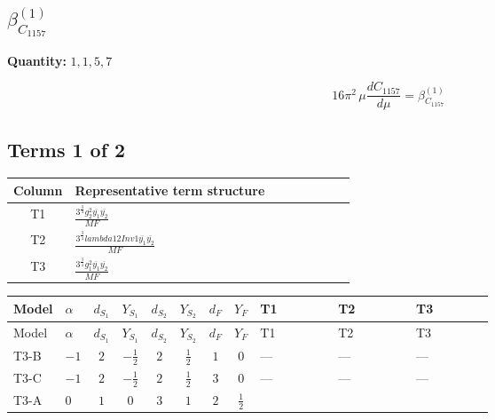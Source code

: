 \documentclass[8pt]{article}
\begin{document}
\begin{landscape}
\section*{$\beta_{C_{1157}}^{(1)}$}
\noindent\textbf{Quantity: }$\mathrm{1,1,5,7}$\par\smallskip
\[16\pi^2\,\mu\frac{d C_{1157}}{d\mu}=\beta_{C_{1157}}^{(1)}\]
\subsection*{Terms 1 of 2}
\begin{center}
\begin{tabular}{@{}c >{\raggedright\arraybackslash}p{0.82\linewidth}@{}}
\toprule
Column & Representative term structure \\
\midrule
T1 & \(\displaystyle \frac{3^{\frac{3}{4}} g_{2}^{2} \overline{y_{1}} \overline{y_{2}}}{MF}\) \\
\midrule
T2 & \(\displaystyle \frac{3^{\frac{3}{4}} lambda12Inv1 \overline{y_{1}} \overline{y_{2}}}{MF}\) \\
\midrule
T3 & \(\displaystyle \frac{3^{\frac{3}{4}} g_{1}^{2} \overline{y_{1}} \overline{y_{2}}}{MF}\) \\
\midrule
\bottomrule
\end{tabular}
\end{center}
\smallskip
\tiny
\begin{longtable}{@{}llcccccc >{\raggedright\arraybackslash}p{0.21\linewidth} >{\raggedright\arraybackslash}p{0.21\linewidth} >{\raggedright\arraybackslash}p{0.21\linewidth}@{}}
\toprule
Model & $\alpha$ & $d_{S_1}$ & $Y_{S_1}$ & $d_{S_2}$ & $Y_{S_2}$ & $d_F$ & $Y_F$ & T1 & T2 & T3 \\
\midrule
\endfirsthead
\toprule
Model & $\alpha$ & $d_{S_1}$ & $Y_{S_1}$ & $d_{S_2}$ & $Y_{S_2}$ & $d_F$ & $Y_F$ & T1 & T2 & T3 \\
\midrule
\endhead
T3-B & $-1$ & $2$ & $-\frac{1}{2}$ & $2$ & $\frac{1}{2}$ & $1$ & $0$ & --- & --- & --- \\
\midrule
T3-C & $-1$ & $2$ & $-\frac{1}{2}$ & $2$ & $\frac{1}{2}$ & $3$ & $0$ & --- & --- & --- \\
\midrule
T3-A & $0$ & $1$ & $0$ & $3$ & $1$ & $2$ & $\frac{1}{2}$ & \scriptsize\adjustbox{max width=\linewidth}{$\begin{gathered} - \frac{11 \cdot 3^{\frac{3}{4}} g_{2}^{2} \overline{y_{1}} \overline{y_{2}}}{8 MF}\end{gathered}$} & \scriptsize\adjustbox{max width=\linewidth}{$\begin{gathered} - \frac{3^{\frac{3}{4}} lambda12Inv1 \overline{y_{1}} \overline{y_{2}}}{6 MF}\end{gathered}$} & \scriptsize\adjustbox{max width=\linewidth}{$\begin{gathered} - \frac{3^{\frac{3}{4}} g_{1}^{2} \overline{y_{1}} \overline{y_{2}}}{8 MF}\end{gathered}$} \\

\end{longtable}
\end{landscape}
\end{document}
